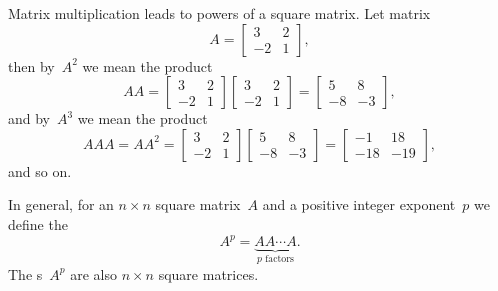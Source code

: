 \begin{example} 
Matrix multiplication leads to powers of a square matrix.
Let matrix
\begin{equation*}
A=\begin{bmatrix} 3&2\\-2&1 \end{bmatrix},
\end{equation*}
then by~\(A^2\) we mean the product
\begin{equation*}
AA=\begin{bmatrix} 3&2\\-2&1 \end{bmatrix}\begin{bmatrix} 3&2\\-2&1 \end{bmatrix}=\begin{bmatrix} 5&8\\-8&-3 \end{bmatrix},
\end{equation*}
and by~\(A^3\) we mean the product
\begin{equation*}
AAA=AA^2=\begin{bmatrix} 3&2\\-2&1 \end{bmatrix}
\begin{bmatrix} 5&8\\-8&-3 \end{bmatrix}
=\begin{bmatrix} -1&18\\-18&-19 \end{bmatrix},
\end{equation*}
and so on.
\end{example}

In general, for an \(n\times n\) square matrix~\(A\) and a positive integer exponent~\(p\) we define the 
\begin{equation*}
A^p=\underbrace{AA\cdots A}_{p\text{ factors}}.
\end{equation*}
The s~\(A^p\) are also \(n\times n\) square matrices.


